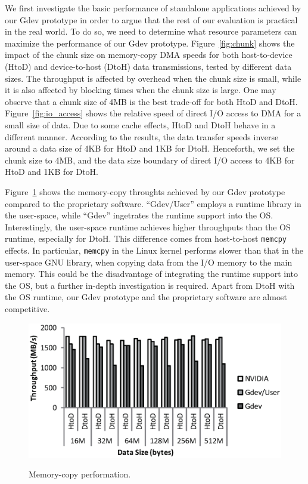 We first investigate the basic performance of standalone applications
achieved by our Gdev prototype in order to argue that the rest of our
evaluation is practical in the real world. 
To do so, we need to determine what resource parameters can maximize the
performance of our Gdev prototype. 
Figure~\ref{fig:chunk} shows the impact of the chunk size on memory-copy
DMA speeds for both host-to-device (HtoD) and device-to-host (DtoH)
data transmissions, tested by different data sizes.
The throughput is affected by overhead when the chunk size is small,
while it is also affected by blocking times when the chunk size is
large.
One may observe that a chunk size of 4MB is the best trade-off
for both HtoD and DtoH.
Figure~\ref{fig:io_access} shows the relative speed of direct I/O
access to DMA for a small size of data. 
Due to some cache effects, HtoD and DtoH behave in a different manner.
According to the results, the data transfer speeds inverse around a
data size of 4KB for HtoD and 1KB for DtoH.
Henceforth, we set the chunk size to 4MB, and the data size boundary of
direct I/O access to 4KB for HtoD and 1KB for DtoH.

Figure~\ref{fig:memcpy} shows the memory-copy throughts achieved
by our Gdev prototype compared to the proprietary software.
``Gdev/User'' employs a runtime library in the user-space, while
``Gdev'' ingetrates the runtime support into the OS.
Interestingly, the user-space runtime achieves higher throughputs than
the OS runtime, especially for DtoH.
This difference comes from host-to-host \texttt{memcpy} effects.
In particular, \texttt{memcpy} in the Linux kernel performs slower than
that in the user-space GNU library, when copying data from the I/O
memory to the main memory.
This could be the disadvantage of integrating the runtime support into
the OS, but a further in-depth investigation is required.
Apart from DtoH with the OS runtime, our Gdev prototype and the
proprietary software are almost competitive.
 
\begin{figure}[t]
 \begin{center}
  \vspace{-0.5em}
  \includegraphics[width=0.9\hsize]{eps/memcpy.eps}\\
  \vspace{-1.5em}
  \caption{Memory-copy performation.}
  \label{fig:memcpy}
 \end{center}
 \vspace{-2em}
\end{figure}

